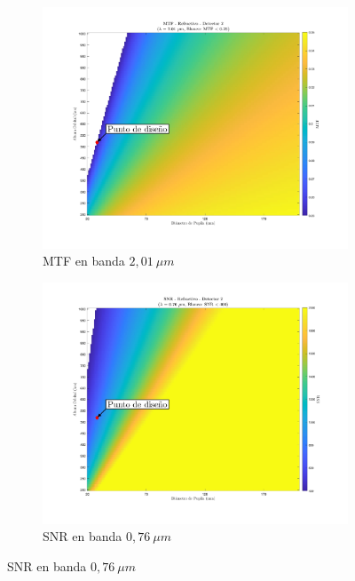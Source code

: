 \begin{figure}[H]
    \centering
    \begin{subfigure}[b]{0.3\textwidth}
        \centering
        \includegraphics[width=\textwidth]{5.Mission/TFG_Tikz-4.jpg}
        \caption{MTF en banda $2,01\ \mu m$}
        \label{fig:sub1}
    \end{subfigure}
    \hfill
    \begin{subfigure}[b]{0.3\textwidth}
        \centering
        \includegraphics[width=\textwidth]{5.Mission/TFG_Tikz-5.jpg}
        \caption{SNR en banda $0,76\ \mu m$}
        \label{fig:sub2}
    \end{subfigure}

\end{figure}
